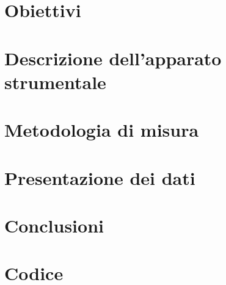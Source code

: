 \documentclass[12pt,a4paper]{article} %
\begin{document}
\maketitle %

\section{Obiettivi}
	

\section{Descrizione dell'apparato strumentale}
	

\section{Metodologia di misura}
	
	\clearpage
	
\section{Presentazione dei dati}			
	\subsection{}
	
	
	\clearpage
	
		
\section{Conclusioni}
	
	
\section{Codice}	
	
	
\end{document}
